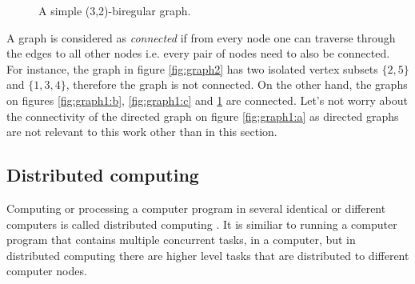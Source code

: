 \begin{figure}[h]
\centering
\caption{A simple (3,2)-biregular graph.\label{fig:graph3}}
\end{figure}

A graph is considered as \emph{connected} if from every node one can traverse through the edges to all other nodes i.e. every pair of nodes need to also be connected.
For instance, the graph in figure \ref{fig:graph2} has two isolated vertex subsets $\{2, 5\}$ and $\{1, 3, 4\}$, therefore the graph is not connected.
On the other hand, the graphs on figures \ref{fig:graph1:b}, \ref{fig:graph1:c} and \ref{fig:graph3} are connected.
Let's not worry about the connectivity of the directed graph on figure \ref{fig:graph1:a} as directed graphs are not relevant to this work other than in this section.


\subsection{Distributed computing} \label{sec:distributed_computing}
Computing or processing a computer program in several identical or different computers is called distributed computing
\cite{DBLP:books/el/leeuwen90/LamportL90}.
It is similiar to running a computer program that contains multiple concurrent tasks, in a computer, but in distributed computing there are higher level tasks that are distributed to different computer nodes.

